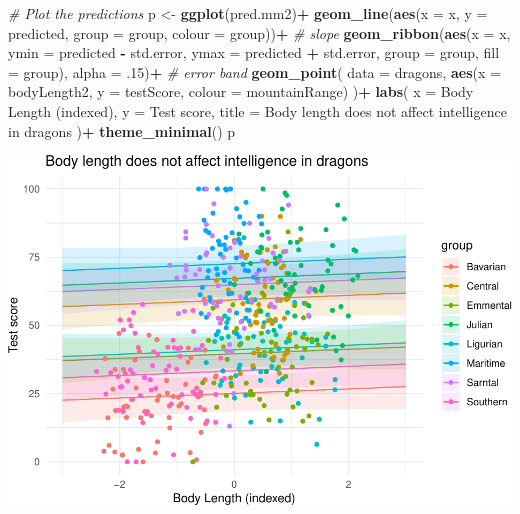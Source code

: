 \documentclass[
]{article}
\newenvironment{Shaded}{\begin{snugshade}}{\end{snugshade}}
\newcommand{\AttributeTok}[1]{\textcolor[rgb]{0.13,0.29,0.53}{#1}}
\newcommand{\CommentTok}[1]{\textcolor[rgb]{0.56,0.35,0.01}{\textit{#1}}}
\newcommand{\DecValTok}[1]{\textcolor[rgb]{0.00,0.00,0.81}{#1}}
\newcommand{\FunctionTok}[1]{\textcolor[rgb]{0.13,0.29,0.53}{\textbf{#1}}}
\newcommand{\NormalTok}[1]{#1}
\newcommand{\OtherTok}[1]{\textcolor[rgb]{0.56,0.35,0.01}{#1}}
\newcommand{\SpecialCharTok}[1]{\textcolor[rgb]{0.81,0.36,0.00}{\textbf{#1}}}
\newcommand{\StringTok}[1]{\textcolor[rgb]{0.31,0.60,0.02}{#1}}
\begin{document}
\begin{Shaded}
\begin{Highlighting}[]
\CommentTok{\# Plot the predictions}
\NormalTok{p }\OtherTok{\textless{}{-}} \FunctionTok{ggplot}\NormalTok{(pred.mm2)}\SpecialCharTok{+}
  \FunctionTok{geom\_line}\NormalTok{(}\FunctionTok{aes}\NormalTok{(}\AttributeTok{x =}\NormalTok{ x, }\AttributeTok{y =}\NormalTok{ predicted, }\AttributeTok{group =}\NormalTok{ group, }\AttributeTok{colour =}\NormalTok{ group))}\SpecialCharTok{+}   \CommentTok{\# slope}
  \FunctionTok{geom\_ribbon}\NormalTok{(}\FunctionTok{aes}\NormalTok{(}\AttributeTok{x =}\NormalTok{ x, }\AttributeTok{ymin =}\NormalTok{ predicted }\SpecialCharTok{{-}}\NormalTok{ std.error, }\AttributeTok{ymax =}\NormalTok{ predicted }\SpecialCharTok{+}\NormalTok{ std.error, }\AttributeTok{group =}\NormalTok{ group, }\AttributeTok{fill =}\NormalTok{ group), }\AttributeTok{alpha =}\NormalTok{ .}\DecValTok{15}\NormalTok{)}\SpecialCharTok{+}   \CommentTok{\# error band}
  \FunctionTok{geom\_point}\NormalTok{(}
    \AttributeTok{data =}\NormalTok{ dragons,}
    \FunctionTok{aes}\NormalTok{(}\AttributeTok{x =}\NormalTok{ bodyLength2, }\AttributeTok{y =}\NormalTok{ testScore, }\AttributeTok{colour =}\NormalTok{ mountainRange)}
\NormalTok{  )}\SpecialCharTok{+}
  \FunctionTok{labs}\NormalTok{(}
    \AttributeTok{x =} \StringTok{\textquotesingle{}Body Length (indexed)\textquotesingle{}}\NormalTok{, }\AttributeTok{y =} \StringTok{\textquotesingle{}Test score\textquotesingle{}}\NormalTok{,}
    \AttributeTok{title =} \StringTok{\textquotesingle{}Body length does not affect intelligence in dragons\textquotesingle{}}
\NormalTok{  )}\SpecialCharTok{+}
  \FunctionTok{theme\_minimal}\NormalTok{()}
\NormalTok{p}
\end{Highlighting}
\end{Shaded}

\includegraphics{Introduction-to-linear-mixed-models_files/figure-latex/unnamed-chunk-25-1.pdf}
\end{document}
